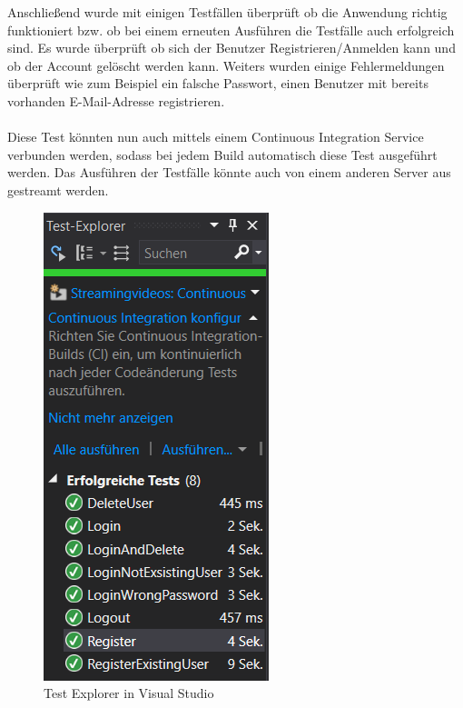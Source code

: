 \begin{minipage}[h]{0.4\textwidth}
	Anschließend wurde mit einigen Testfällen überprüft ob die Anwendung richtig funktioniert bzw. ob bei einem erneuten Ausführen die Testfälle auch erfolgreich sind. Es wurde überprüft ob sich der Benutzer Registrieren/Anmelden kann und ob der Account gelöscht werden kann. Weiters wurden einige Fehlermeldungen überprüft wie zum Beispiel ein falsche Passwort, einen Benutzer mit bereits vorhanden E-Mail-Adresse registrieren. 
	\\\\ 
	Diese Test könnten nun auch mittels einem Continuous  Integration Service verbunden werden, sodass bei jedem Build automatisch diese Test ausgeführt werden. Das Ausführen der Testfälle könnte auch von einem anderen Server aus gestreamt werden.
\end{minipage}
\begin{minipage}[h]{0.6\textwidth}
	\begin{figure}[H]
		\centering
		\includegraphics[width=0.5\linewidth]{images/screenshot008}
		\caption{Test Explorer in Visual Studio}
		\label{fig:screenshot008}
	\end{figure}
\end{minipage}



